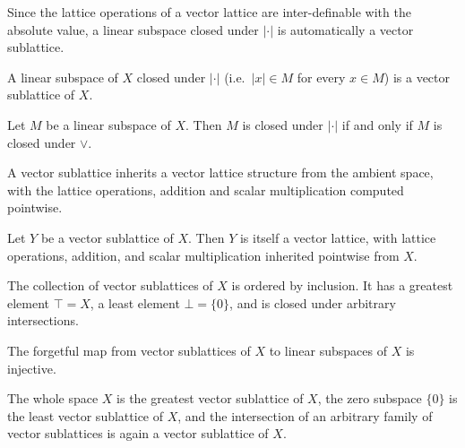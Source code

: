 Since the lattice operations of a vector lattice are inter-definable with
the absolute value, a linear subspace closed under $\lvert \cdot \rvert$
is automatically a vector sublattice.

\begin{lemma}
\label{lem:vectorSublattice-ofAbsClosed}
\leanok
{}
A linear subspace of $X$ closed under $\lvert \cdot \rvert$ (i.e.\
$\lvert x \rvert \in M$ for every $x \in M$) is a vector sublattice of
$X$.
\end{lemma}

\begin{lemma}
\label{lem:vectorSublattice-abs-mem-iff-sup-mem}
\leanok
{}
Let $M$ be a linear subspace of $X$. Then $M$ is closed under
$\lvert \cdot \rvert$ if and only if $M$ is closed under $\vee$.
\end{lemma}

A vector sublattice inherits a vector lattice structure from the ambient
space, with the lattice operations, addition and scalar multiplication
computed pointwise.

\begin{lemma}
\label{lem:vectorSublattice-instVectorLatticeSubtype}
\leanok
{}
Let $Y$ be a vector sublattice of $X$. Then $Y$ is itself a vector
lattice, with lattice operations, addition, and scalar multiplication
inherited pointwise from $X$.
\end{lemma}

The collection of vector sublattices of $X$ is ordered by inclusion. It
has a greatest element $\top = X$, a least element $\bot = \{0\}$, and is
closed under arbitrary intersections.

\begin{lemma}
\label{lem:vectorSublattice-toSubmodule-injective}
\leanok
{}
The forgetful map from vector sublattices of $X$ to linear subspaces of
$X$ is injective.
\end{lemma}

\begin{lemma}
\label{lem:vectorSublattice-complete-lattice}
\leanok
{}
The whole space $X$ is the greatest vector sublattice of $X$, the zero
subspace $\{0\}$ is the least vector sublattice of $X$, and the
intersection of an arbitrary family of vector sublattices is again a
vector sublattice of $X$.
\end{lemma}

